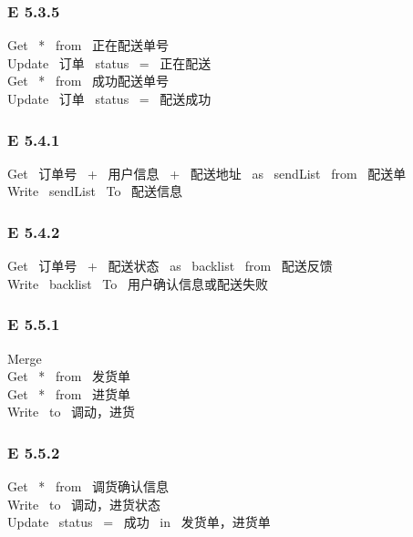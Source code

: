 \subsubsection*{E 5.3.5}
Get \ * \ from \ 正在配送单号 \\ 
Update \ 订单 \ status \ = \ 正在配送 \\ 
Get \ * \ from \ 成功配送单号 \\ 
Update \ 订单 \ status \ = \ 配送成功\\ 
\vspace{-1mm}
\subsubsection*{E 5.4.1}
Get \ 订单号 \ + \ 用户信息 \ + \ 配送地址 \ as \ sendList \ from \ 配送单 \\ 
Write \ sendList \ To \ 配送信息\\ 
\vspace{-1mm}
\subsubsection*{E 5.4.2}
Get \ 订单号 \ + \ 配送状态 \ as \ backlist \ from \ 配送反馈 \\ 
Write \ backlist \ To \ 用户确认信息或配送失败\\ 
\vspace{-1mm}
\subsubsection*{E 5.5.1}
Merge\\ 
Get \ * \ from \ 发货单 \\ 
Get \ * \ from \ 进货单 \\ 
Write \ to \ 调动，进货\\ 
\vspace{-1mm}
\subsubsection*{E 5.5.2}
Get \ * \ from \ 调货确认信息\\ 
Write \ to \ 调动，进货状态\\ 
Update \ status \ = \ 成功 \ in \ 发货单，进货单\\ 
\vspace{-1mm}
